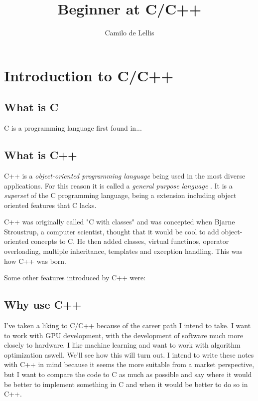 \documentclass{article}
\title{Beginner at C/C++}
\author{Camilo de Lellis}
\begin{document}
\maketitle
\tableofcontents

\section{Introduction to C/C++}

\subsection{What is C}
C is a programming language first found in...

\subsection{What is C++}
C++ is a \textit{object-oriented programming language} being used in the most diverse applications. For this reason it is called a \textit{general purpose language} \cite{wikibooks_cpp}. It is a \textit{superset} of the C programming language, being a extension including object oriented features that C lacks.

C++ was originally called "C with classes" and was concepted when Bjarne Stroustrup, a computer scientist, thought that it would be cool to add object-oriented concepts to C. He then added classes, virtual functinos, operator overloading, multiple inheritance, templates and exception handling. This was how C++ was born. \cite{wikibooks_cpp}

Some other features introduced by C++ were:

\cite{wikibooks_cpp}

\subsection{Why use C++}
I've taken a liking to C/C++ because of the career path I intend to take. I want to work with GPU development, with the development of software much more closely to hardware. I like machine learning and want to work with algorithm optimization aswell. We'll see how this will turn out. I intend to write these notes with C++ in mind because it seems the more suitable from a market perspective, but I want to compare the code to C as much as possible and say where it would be better to implement something in C and when it would be better to do so in C++.
\end{document}
